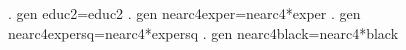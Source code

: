 . gen educ2=educ{\caret}2
{\smallskip}
. gen nearc4exper=nearc4*exper
{\smallskip}
. gen nearc4expersq=nearc4*expersq
{\smallskip}
. gen nearc4black=nearc4*black
{\smallskip}
